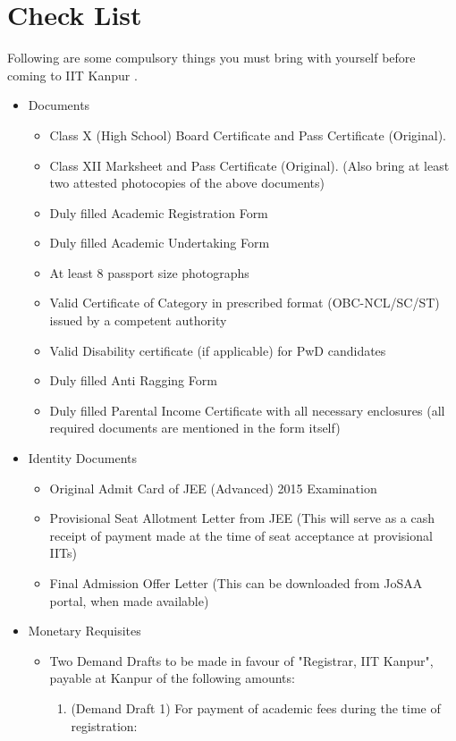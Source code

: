 \documentclass[11pt]{article}
\begin{document}
\section{Check List}
Following are some compulsory things you must bring with yourself before coming to IIT Kanpur \cite{entry:1}	.
\begin{itemize}
\item Documents
	\begin{itemize}
		\item Class X (High School) Board Certificate and Pass Certificate (Original).
		\item Class XII Marksheet and Pass Certificate (Original).
			  (Also bring at least two attested photocopies of the above documents)
		\item Duly filled Academic Registration Form 
		\item Duly filled Academic Undertaking Form
		\item At least 8 passport size photographs
		\item Valid Certificate of Category in prescribed format (OBC-NCL/SC/ST) issued by a competent authority 
		\item Valid Disability certificate (if applicable) for PwD candidates
		\item Duly filled Anti Ragging Form 
		\item Duly filled Parental Income Certificate with all necessary enclosures (all required documents are mentioned in the form itself)
	\end{itemize}
\item Identity Documents
	\begin{itemize}
		\item Original Admit Card of JEE (Advanced) 2015 Examination
		\item Provisional Seat Allotment Letter from JEE (This will serve as a cash receipt of payment made at the time of seat acceptance at provisional IITs)
		\item Final Admission Offer Letter (This can be downloaded from JoSAA portal, when made available)
	\end{itemize}
\item Monetary Requisites
	\begin{itemize}
		\item Two Demand Drafts to be made in favour of "Registrar, IIT Kanpur", payable at Kanpur of the following amounts:
		\begin{enumerate}
			\item (Demand Draft 1) For payment of academic fees during the time of registration:  

\end{enumerate}
\end{itemize}
\end{itemize}
\end{document}
